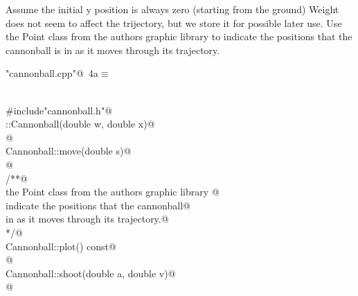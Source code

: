 \documentclass{article}
\begin{document}
Assume the initial y position is always zero (starting from the ground)
Weight does not seem to affect the trijectory, but we store it for possible later
use. Use the Point class from the authors graphic library to indicate the positions
that the cannonball is in as it moves through its trajectory.
\begin{flushleft} \small
\begin{minipage}{\linewidth}\label{scrap2}\raggedright\small
{} \verb@"cannonball.cpp"@\nobreak\ {\footnotesize {4a}}$\equiv$
\vspace{-1ex}
\begin{list}{}{} \item
\mbox{}\verb@@\\
\mbox{}\verb@#include"cannonball.h"@\\
\mbox{}\verb@Cannonball::Cannonball(double w, double x)@\\
\mbox{}@\\
\mbox{}\verb@void Cannonball::move(double s)@\\
\mbox{}@\\
\mbox{}\verb@/**@\\
\mbox{}\verb@Use the Point class from the authors graphic library @\\
\mbox{}\verb@to indicate the positions that the cannonball@\\
\mbox{}\verb@is in as it moves through its trajectory.@\\
\mbox{}\verb@*/@\\
\mbox{}\verb@void Cannonball::plot() const@\\
\mbox{}@\\
\mbox{}\verb@void Cannonball::shoot(double a, double v)@\\
\mbox{}@\\
\mbox{}\verb@@{\NWsep}
\end{list}
\vspace{-1.5ex}
\footnotesize
\begin{list}{}{\setlength{\itemsep}{-\parsep}\setlength{\itemindent}{-\leftmargin}}

\item{}
\end{list}
\end{minipage}\vspace{4ex}
\end{flushleft}
\end{document}
